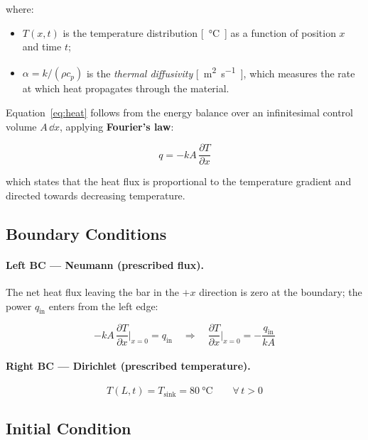 \documentclass[11pt, a4paper]{scrartcl}
\begin{document}
\begin{onehalfspace}
where:
\begin{itemize}
  \item $T(x,t)$ is the temperature distribution \si{[\celsius]} as a function of position $x$ and time $t$;
  \item $\alpha = k/(\rho c_p)$ is the \emph{thermal diffusivity} \si{[\meter\squared\per\second]}, which measures the rate at which heat propagates through the material.
\end{itemize}

Equation~\eqref{eq:heat} follows from the energy balance over an infinitesimal control volume $A\,\dd x$, applying \textbf{Fourier's law}:

\begin{equation}
  q = -k A \, \frac{\partial T}{\partial x}
  \label{eq:fourier}
\end{equation}

which states that the heat flux is proportional to the temperature gradient and directed towards decreasing temperature.

\subsection{Boundary Conditions}

\paragraph{Left BC — Neumann (prescribed flux).}
The net heat flux leaving the bar in the $+x$ direction is zero at the boundary; the power $q_\text{in}$ enters from the left edge:

\begin{equation}
  -k A \, \frac{\partial T}{\partial x}\bigg|_{x=0} = q_\text{in}
  \quad \Longrightarrow \quad
  \frac{\partial T}{\partial x}\bigg|_{x=0} = -\frac{q_\text{in}}{k A}
  \label{eq:BC_neumann}
\end{equation}

\paragraph{Right BC — Dirichlet (prescribed temperature).}

\begin{equation}
  T(L, t) = T_\text{sink} = \SI{80}{\celsius} \qquad \forall\, t > 0
  \label{eq:BC_dirichlet}
\end{equation}

\subsection{Initial Condition}


\end{onehalfspace}
\end{document}
